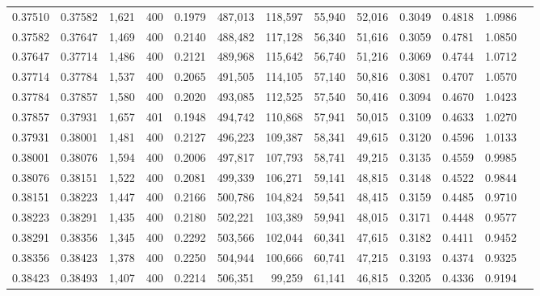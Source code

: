\begin{tabular}{rrrrrrrrrrrrr}
0.37510 & 0.37582 &  1,621 & 400 &                                     0.1979 & 487,013 & 118,597 &  55,940 &  52,016 & 0.3049 & 0.4818 & 1.0986 \\
0.37582 & 0.37647 &  1,469 & 400 &                                     0.2140 & 488,482 & 117,128 &  56,340 &  51,616 & 0.3059 & 0.4781 & 1.0850 \\
0.37647 & 0.37714 &  1,486 & 400 &                                     0.2121 & 489,968 & 115,642 &  56,740 &  51,216 & 0.3069 & 0.4744 & 1.0712 \\
0.37714 & 0.37784 &  1,537 & 400 &                                     0.2065 & 491,505 & 114,105 &  57,140 &  50,816 & 0.3081 & 0.4707 & 1.0570 \\
0.37784 & 0.37857 &  1,580 & 400 &                                     0.2020 & 493,085 & 112,525 &  57,540 &  50,416 & 0.3094 & 0.4670 & 1.0423 \\
0.37857 & 0.37931 &  1,657 & 401 &                                     0.1948 & 494,742 & 110,868 &  57,941 &  50,015 & 0.3109 & 0.4633 & 1.0270 \\
0.37931 & 0.38001 &  1,481 & 400 &                                     0.2127 & 496,223 & 109,387 &  58,341 &  49,615 & 0.3120 & 0.4596 & 1.0133 \\
0.38001 & 0.38076 &  1,594 & 400 &                                     0.2006 & 497,817 & 107,793 &  58,741 &  49,215 & 0.3135 & 0.4559 & 0.9985 \\
0.38076 & 0.38151 &  1,522 & 400 &                                     0.2081 & 499,339 & 106,271 &  59,141 &  48,815 & 0.3148 & 0.4522 & 0.9844 \\
0.38151 & 0.38223 &  1,447 & 400 &                                     0.2166 & 500,786 & 104,824 &  59,541 &  48,415 & 0.3159 & 0.4485 & 0.9710 \\
0.38223 & 0.38291 &  1,435 & 400 &                                     0.2180 & 502,221 & 103,389 &  59,941 &  48,015 & 0.3171 & 0.4448 & 0.9577 \\
0.38291 & 0.38356 &  1,345 & 400 &                                     0.2292 & 503,566 & 102,044 &  60,341 &  47,615 & 0.3182 & 0.4411 & 0.9452 \\
0.38356 & 0.38423 &  1,378 & 400 &                                     0.2250 & 504,944 & 100,666 &  60,741 &  47,215 & 0.3193 & 0.4374 & 0.9325 \\
0.38423 & 0.38493 &  1,407 & 400 &                                     0.2214 & 506,351 &  99,259 &  61,141 &  46,815 & 0.3205 & 0.4336 & 0.9194 \\

\end{tabular}

